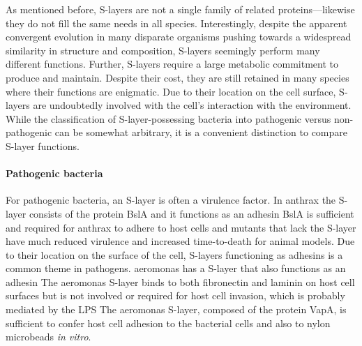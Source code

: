   As mentioned before, \acp{S-layer} are not a single family of related proteins---likewise they do not fill the same needs in all species. Interestingly, despite the apparent
convergent evolution in many disparate organisms pushing towards a widespread similarity in structure and composition, \acp{S-layer} seemingly perform many different functions.
Further, \acp{S-layer} require a large metabolic commitment to produce and maintain. Despite their cost, they are still retained in many species where their functions are
enigmatic. Due to their location on the cell surface, \acp{S-layer} are undoubtedly involved with the cell's interaction with the environment. While the classification of
\ac{S-layer}-possessing bacteria into pathogenic versus non-pathogenic can be somewhat arbitrary, it is a convenient distinction to compare \ac{S-layer} functions.
  
  \paragraph{Pathogenic bacteria} For pathogenic bacteria, an \ac{S-layer} is often a virulence factor. In \acl{anthrax} the \ac{S-layer} consists of the protein BslA and it
functions as an adhesin BslA is sufficient and required for \ac{anthrax} to adhere to host cells and mutants that lack the \ac{S-layer} have much reduced
virulence and increased time-to-death for animal models. Due to their location on the surface of the cell, \acp{S-layer} functioning as adhesins is a common theme in pathogens.
\ac{aeromonas} has a \ac{S-layer} that also functions as an adhesin The \ac{aeromonas} \ac{S-layer} binds to both fibronectin and laminin on host cell
surfaces but is not involved or required for host cell invasion, which is probably mediated by the \ac{LPS} The \ac{aeromonas}
\ac{S-layer}, composed of the protein VapA, is sufficient to confer host cell adhesion to the bacterial cells and also to nylon microbeads \textit{in vitro}.

